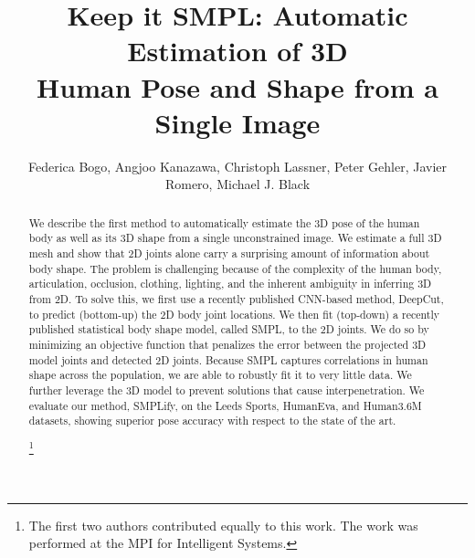 \documentclass[runningheads]{llncs}
\begin{document}
\pagestyle{headings}
\mainmatter

\newcommand{\new}[1]{{\textcolor{red}{#1}}}
\newcommand\blfootnote[1]{\begingroup
  \renewcommand\thefootnote{}\footnote{#1}\addtocounter{footnote}{-1}\endgroup
}

\title{Keep it SMPL: Automatic Estimation of 3D\\ Human Pose and Shape
  from a Single Image} 


\author{Federica Bogo, Angjoo Kanazawa, Christoph Lassner, 
Peter Gehler, Javier  Romero,  Michael J. Black}




\maketitle

\begin{abstract}
We describe the first method to automatically estimate the 3D pose of the human body as well as its 3D shape from a
single unconstrained image.
We estimate a full 3D mesh and show that
2D joints alone carry a surprising amount of information about body shape.
The problem is challenging because of the complexity of the human
body, articulation, occlusion, clothing, lighting, and the inherent ambiguity in inferring
3D from 2D.
To solve this, we first use a recently published CNN-based method, DeepCut, to
predict (bottom-up) the 2D body joint locations.
We then fit (top-down) a recently published statistical body shape model, called
SMPL, to the 2D joints.
We do so  by minimizing an objective function that penalizes
the error between the projected 3D model joints and detected 2D joints.
Because SMPL captures correlations in human shape across
the population, we are able to robustly fit it to very little data.
We further leverage the 3D model to prevent solutions that cause interpenetration.
We evaluate our method, SMPLify, on the Leeds Sports, HumanEva, and Human3.6M datasets,
showing superior pose accuracy with respect to the state of the art.

\blfootnote{ The first two authors contributed equally to this
  work. The work was performed at the MPI for Intelligent Systems.}

\end{abstract}
 
\end{document}
